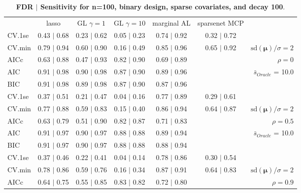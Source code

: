 \clearpage
\begin{table}\vspace{-.5cm}
\caption[l]{ {\it }
{ \bf FDR $\boldsymbol{\mid}$ Sensitivity for n=100, binary design, sparse covariates, and  decay  100}.}
\vspace{-.5cm}
\footnotesize{}
\begin{center}
\begin{tabular}{l*{5}{c}|r}
 & lasso & GL $\gamma=1$ & GL $\gamma=10$ & marginal AL & sparsenet MCP  & \\
 \cline{1-7}
CV.1se & 0.43 $\mid$ 0.68 & 0.23 $\mid$ 0.62 & 0.05 $\mid$ 0.23 & 0.74 $\mid$ 0.92 & 0.32 $\mid$ 0.72 & \\
CV.min & 0.79 $\mid$ 0.94 & 0.60 $\mid$ 0.90 & 0.16 $\mid$ 0.49 & 0.85 $\mid$ 0.96 & 0.65 $\mid$ 0.92 &  $\mathrm{sd}(\mathbf{\mu})/\sigma=2$ \\
AICc & 0.63 $\mid$ 0.88 & 0.47 $\mid$ 0.93 & 0.82 $\mid$ 0.90 & 0.69 $\mid$ 0.89 & & $\rho=0$ \\
AIC & 0.91 $\mid$ 0.98 & 0.90 $\mid$ 0.98 & 0.87 $\mid$ 0.90 & 0.89 $\mid$ 0.96 & &  \multirow{2}{*}{$\bar{s}_{Oracle}$ = 10.0} \\
BIC & 0.91 $\mid$ 0.98 & 0.89 $\mid$ 0.98 & 0.87 $\mid$ 0.90 & 0.87 $\mid$ 0.96 & &  \\
 \hline 
CV.1se & 0.37 $\mid$ 0.51 & 0.21 $\mid$ 0.47 & 0.04 $\mid$ 0.16 & 0.77 $\mid$ 0.89 & 0.29 $\mid$ 0.61 & \\
CV.min & 0.77 $\mid$ 0.88 & 0.59 $\mid$ 0.83 & 0.15 $\mid$ 0.40 & 0.86 $\mid$ 0.94 & 0.64 $\mid$ 0.87 &  $\mathrm{sd}(\mathbf{\mu})/\sigma=2$ \\
AICc & 0.63 $\mid$ 0.79 & 0.51 $\mid$ 0.90 & 0.82 $\mid$ 0.87 & 0.71 $\mid$ 0.83 & & $\rho=0.5$ \\
AIC & 0.91 $\mid$ 0.97 & 0.90 $\mid$ 0.97 & 0.88 $\mid$ 0.88 & 0.89 $\mid$ 0.94 & &  \multirow{2}{*}{$\bar{s}_{Oracle}$ = 10.0} \\
BIC & 0.91 $\mid$ 0.97 & 0.90 $\mid$ 0.97 & 0.88 $\mid$ 0.88 & 0.88 $\mid$ 0.94 & &  \\
 \hline 
CV.1se & 0.37 $\mid$ 0.46 & 0.22 $\mid$ 0.41 & 0.04 $\mid$ 0.14 & 0.78 $\mid$ 0.86 & 0.30 $\mid$ 0.54 & \\
CV.min & 0.78 $\mid$ 0.86 & 0.59 $\mid$ 0.76 & 0.16 $\mid$ 0.34 & 0.87 $\mid$ 0.91 & 0.64 $\mid$ 0.83 &  $\mathrm{sd}(\mathbf{\mu})/\sigma=2$ \\
AICc & 0.64 $\mid$ 0.75 & 0.55 $\mid$ 0.85 & 0.83 $\mid$ 0.82 & 0.72 $\mid$ 0.80 & & $\rho=0.9$ \\

\end{tabular}
\end{center}
\end{table}
